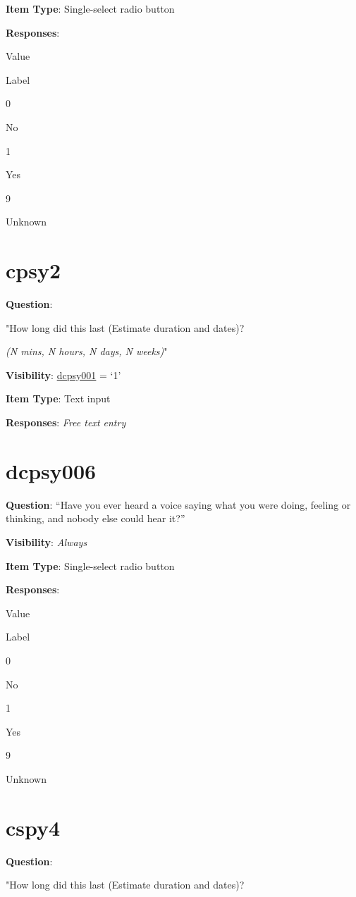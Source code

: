 \documentclass[]{book}
\begin{document}
\textbf{Item Type}: Single-select radio button

\textbf{Responses}:

Value

Label

0

No

1

Yes

9

Unknown

\hypertarget{cpsy2}{%
\section{cpsy2}\label{cpsy2}}

\textbf{Question}:

"How long did this last (Estimate duration and dates)?

\emph{(N mins, N hours, N days, N weeks)}"

\textbf{Visibility}: \protect\hyperlink{dcpsy001}{dcpsy001} = `1'

\textbf{Item Type}: Text input

\textbf{Responses}: \emph{Free text entry}

\hypertarget{dcpsy006}{%
\section{dcpsy006}\label{dcpsy006}}

\textbf{Question}: ``Have you ever heard a voice saying what you were doing, feeling or thinking, and nobody else could hear it?''

\textbf{Visibility}: \emph{Always}

\textbf{Item Type}: Single-select radio button

\textbf{Responses}:

Value

Label

0

No

1

Yes

9

Unknown

\hypertarget{cspy4}{%
\section{cspy4}\label{cspy4}}

\textbf{Question}:

"How long did this last (Estimate duration and dates)?
\end{document}
